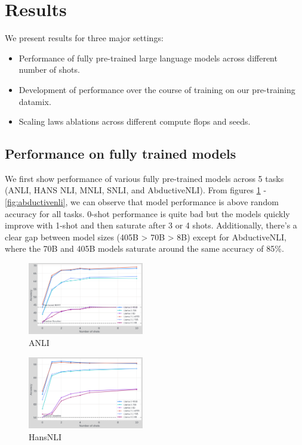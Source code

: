 \section{Results}

We present results for three major settings:
\begin{itemize}
    \item Performance of fully pre-trained large language models across different number of shots.
    \item Development of performance over the course of training on our pre-training datamix.
    \item Scaling laws ablations across different compute flops and seeds.
\end{itemize}

\subsection{Performance on fully trained models}

We first show performance of various fully pre-trained models across 5 tasks (ANLI, HANS NLI, MNLI, SNLI, and AbductiveNLI). From figures \ref{fig:anli} - \ref{fig:abductivenli}, we can observe that model performance is above random accuracy for all tasks. 0-shot performance is quite bad but the models quickly improve with 1-shot and then saturate after 3 or 4 shots. Additionally, there's a clear gap between model sizes (405B > 70B > 8B) except for AbductiveNLI, where the 70B and 405B models saturate around the same accuracy of 85\%.

\begin{figure}[t]
    \centering
    \includegraphics[width=0.45\textwidth]{nli_plots/anli.png}
    \caption{ANLI}
    \label{fig:anli}
\end{figure}

\begin{figure}[t]
    \centering
    \includegraphics[width=0.45\textwidth]{nli_plots/hansnli.png}
    \caption{HansNLI}
    \label{fig:hansnli}
\end{figure}

